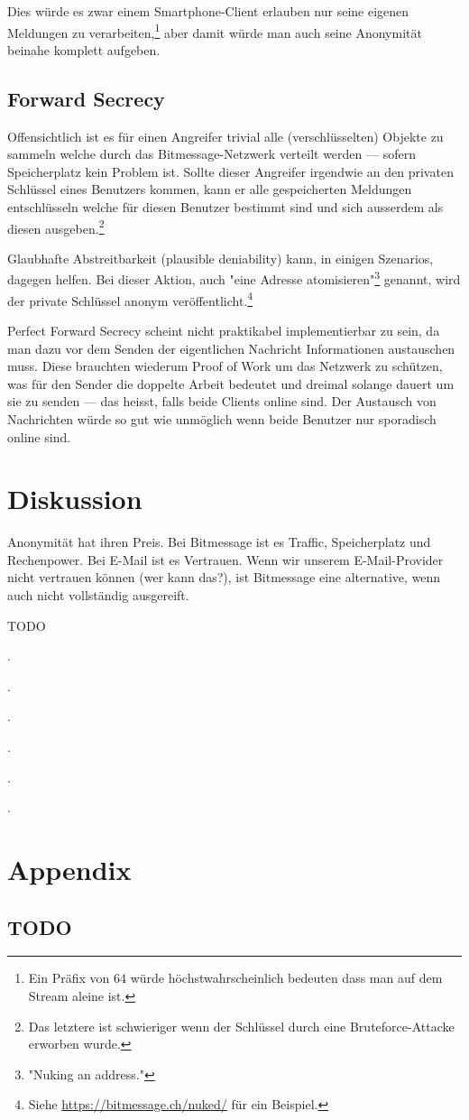\documentclass{bfh}
\begin{document}
  Dies würde es zwar einem Smartphone-Client erlauben nur seine eigenen Meldungen zu verarbeiten,\footnote{Ein Präfix von 64 würde höchstwahrscheinlich bedeuten dass man auf dem Stream aleine ist.} aber damit würde man auch seine Anonymität beinahe komplett aufgeben.

  \subsection{Forward Secrecy}

  Offensichtlich ist es für einen Angreifer trivial alle (verschlüsselten) Objekte zu sammeln welche durch das Bitmessage-Netzwerk verteilt werden --- sofern Speicherplatz kein Problem ist. Sollte dieser Angreifer irgendwie an den privaten Schlüssel eines Benutzers kommen, kann er alle gespeicherten Meldungen entschlüsseln welche für diesen Benutzer bestimmt sind und sich ausserdem als diesen ausgeben.\footnote{Das letztere ist schwieriger wenn der Schlüssel durch eine Bruteforce-Attacke erworben wurde.}

  Glaubhafte Abstreitbarkeit (plausible deniability) kann, in einigen Szenarios, dagegen helfen. Bei dieser Aktion, auch "eine Adresse atomisieren"\footnote{"Nuking an address."} genannt, wird der private Schlüssel anonym veröffentlicht.\footnote{Siehe \url{https://bitmessage.ch/nuked/} für ein Beispiel.}

  Perfect Forward Secrecy scheint nicht praktikabel implementierbar zu sein, da man dazu vor dem Senden der eigentlichen Nachricht Informationen austauschen muss. Diese brauchten wiederum Proof of Work um das Netzwerk zu schützen, was für den Sender die doppelte Arbeit bedeutet und dreimal solange dauert um sie zu senden --- das heisst, falls beide Clients online sind. Der Austausch von Nachrichten würde so gut wie unmöglich wenn beide Benutzer nur sporadisch online sind.

  \newpage
  \section{Diskussion}

  Anonymität hat ihren Preis. Bei Bitmessage ist es Traffic, Speicherplatz und Rechenpower. Bei E-Mail ist es Vertrauen. Wenn wir unserem E-Mail-Provider nicht vertrauen können (wer kann das?), ist Bitmessage eine alternative, wenn auch nicht vollständig ausgereift.

  TODO

  .

  .

  .

  .

  .

  .


  
  

  \appendix
  \section*{Appendix}
  \renewcommand{\thesubsection}{\Alph{subsection}}

  \subsection{TODO}
\end{document}
